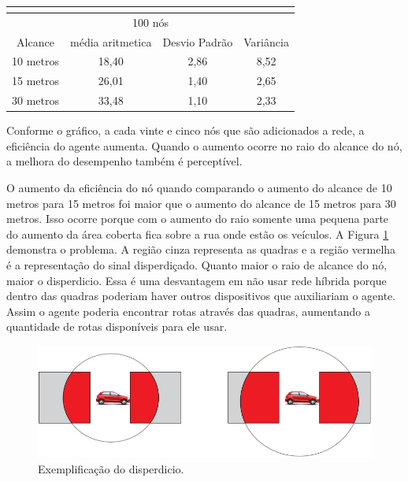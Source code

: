 \begin{table}[!htb]
\begin{minipage}{.5\linewidth}
\begin{tabular}{|c|c|c|c|}
			\multicolumn{4}{|c|}{} \\ \hline


			\multicolumn{4}{|c|}{100 nós} \\ \hline
			Alcance   & média aritmetica &	Desvio Padrão &	Variância  \\ \hline
			10 metros &	18,40	& 2,86 & 8,52  \\ \hline
			15 metros &	26,01	& 1,40 & 2,65  \\ \hline
			30 metros &	33,48	& 1,10 & 2,33 \\ \hline

		\end{tabular}

	    \end{minipage} 
	\end{table}

Conforme o gráfico, a cada vinte e cinco nós que são adicionados a rede, a eficiência do agente aumenta. Quando o aumento ocorre no raio do alcance do nó, a melhora do desempenho também é perceptível. 

O aumento da eficiência do nó quando comparando o aumento do alcance de 10 metros para 15 metros foi maior que o aumento do alcance de 15 metros para 30 metros. Isso ocorre porque com o aumento do raio somente uma pequena parte do aumento da área coberta fica sobre a rua onde estão os veículos. A Figura \ref{fig:problemaDisperdicio} demonstra o problema. A região cinza representa as quadras e a região vermelha é a representação do sinal disperdiçado. Quanto maior o raio de alcance do nó, maior o disperdicio. Essa é uma desvantagem em não usar rede híbrida porque dentro das quadras poderiam haver outros dispositivos que auxiliariam o agente. Assim o agente poderia encontrar rotas através das quadras, aumentando a quantidade de rotas disponíveis para ele usar.%

\begin{figure}[htbp]
		\centering
		\includegraphics[scale=0.5]{resultados/figuras/problemaDisperdicio.pdf}
		\caption{Exemplificação do disperdicio.}
		\label{fig:problemaDisperdicio}
	\end{figure}


